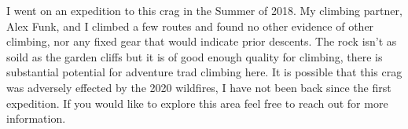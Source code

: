 \begin{multicols}{2}
I went on an expedition to this crag in the Summer of 2018. My climbing partner, Alex Funk, and I climbed a few routes and found no other evidence of other climbing, nor any fixed gear that would indicate prior descents. The rock isn't as soild as the garden cliffs but it is of good enough quality for climbing, there is substantial potential for adventure trad climbing here. It is possible that this crag was adversely effected by the 2020 wildfires, I have not been back since the first expedition. If you would like to explore this area feel free to reach out for more information.\\
	




\end{multicols}
\clearpage